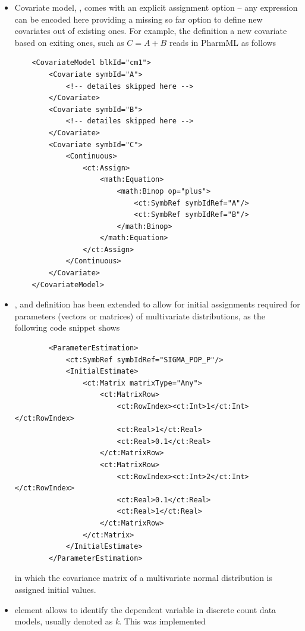\begin{itemize}
\item 
Covariate model, , comes with an explicit assignment option -- any expression 
can be encoded here providing a missing so far option to define new covariates
out of existing ones. For example, the definition a new covariate based on exiting ones, 
such as $C=A+B$ reads in PharmML as follows 
\lstset{language=XML}
\begin{lstlisting}
    <CovariateModel blkId="cm1">
        <Covariate symbId="A">
            <!-- detailes skipped here -->
        </Covariate>
        <Covariate symbId="B">
            <!-- detailes skipped here -->
        </Covariate>
        <Covariate symbId="C">
            <Continuous>
                <ct:Assign>
                    <math:Equation>
                        <math:Binop op="plus">
                            <ct:SymbRef symbIdRef="A"/>
                            <ct:SymbRef symbIdRef="B"/>
                        </math:Binop>
                    </math:Equation>
                </ct:Assign>
            </Continuous>
        </Covariate>
    </CovariateModel>
\end{lstlisting}
\item 
{},  and  definition
has been extended to allow for initial assignments required for parameters 
(vectors or matrices) of multivariate distributions, as the following code snippet 
shows
\lstset{language=XML}
\begin{lstlisting}
        <ParameterEstimation>
            <ct:SymbRef symbIdRef="SIGMA_POP_P"/>
            <InitialEstimate>
                <ct:Matrix matrixType="Any">
                    <ct:MatrixRow>
                        <ct:RowIndex><ct:Int>1</ct:Int></ct:RowIndex>
                        <ct:Real>1</ct:Real>
                        <ct:Real>0.1</ct:Real>
                    </ct:MatrixRow>
                    <ct:MatrixRow>
                        <ct:RowIndex><ct:Int>2</ct:Int></ct:RowIndex>
                        <ct:Real>0.1</ct:Real>
                        <ct:Real>1</ct:Real>
                    </ct:MatrixRow>
                </ct:Matrix>
            </InitialEstimate>
        </ParameterEstimation>
\end{lstlisting}
in which the covariance matrix of a multivariate normal distribution
is assigned initial values.
\item 
{} element allows to identify the dependent variable 
in discrete count data models, usually denoted as \emph{k}. This was implemented

\end{itemize}
